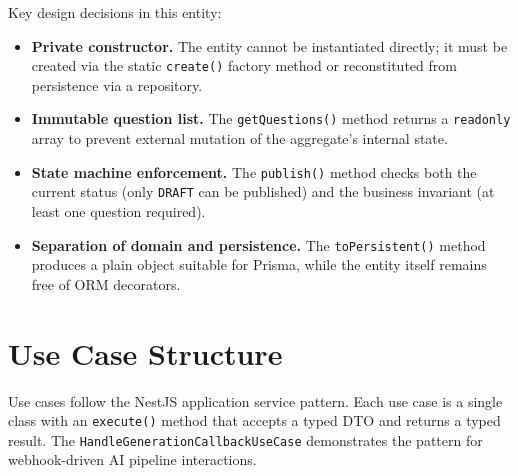 Key design decisions in this entity:

\begin{itemize}
  \item \textbf{Private constructor.} The entity cannot be instantiated directly; it must be created via the static \texttt{create()} factory method or reconstituted from persistence via a repository.
  \item \textbf{Immutable question list.} The \texttt{getQuestions()} method returns a \texttt{readonly} array to prevent external mutation of the aggregate's internal state.
  \item \textbf{State machine enforcement.} The \texttt{publish()} method checks both the current status (only \texttt{DRAFT} can be published) and the business invariant (at least one question required).
  \item \textbf{Separation of domain and persistence.} The \texttt{toPersistent()} method produces a plain object suitable for Prisma, while the entity itself remains free of ORM decorators.
\end{itemize}

\section{Use Case Structure}
\label{sec:app-usecases-code}

Use cases follow the NestJS application service pattern. Each use case is a single class with an \texttt{execute()} method that accepts a typed DTO and returns a typed result. The \texttt{HandleGenerationCallbackUseCase} demonstrates the pattern for webhook-driven AI pipeline interactions.


